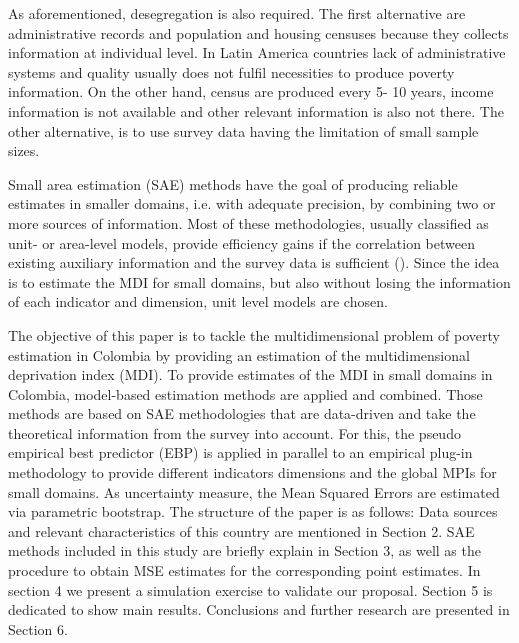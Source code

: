 \documentclass[a4paper, 11pt]{article}
\begin{document}
As aforementioned, desegregation is also required. The first alternative are administrative records and population and housing censuses because they collects information at individual level. In Latin America countries lack of administrative systems and quality usually does not fulfil necessities to produce poverty information. On the other hand, census are produced every 5- 10 years, income information is not available and other relevant information is also not there. The other alternative, is to use survey data having the limitation of small sample sizes. 

Small area estimation (SAE) methods have the goal of producing reliable estimates in smaller domains, i.e. with adequate precision, by combining two or more sources of information. Most of these methodologies, usually classified as unit- or area-level models, provide efficiency gains if the correlation between existing auxiliary information and the survey data is sufficient (\citealt{Pfeffermann2013, Rao2015,  Pratesi2016, tzavidis2018start}).  Since the idea is to estimate the MDI for small domains, but also without losing the information of each indicator and dimension, unit level models are chosen. 


The objective of this paper is to tackle the multidimensional problem of poverty estimation in Colombia by providing an estimation of the multidimensional deprivation index (MDI). To provide estimates of the MDI in small domains in Colombia, model-based estimation methods are applied and combined. Those methods are based on SAE methodologies that are data-driven and take the theoretical information from the survey into account. For this, the pseudo empirical best predictor (EBP) is applied in parallel to an empirical plug-in methodology to provide different indicators dimensions and the global MPIs for small domains. As uncertainty measure, the Mean Squared Errors are estimated via parametric bootstrap.
The structure of the paper is as follows: Data sources and relevant characteristics of this country are mentioned in Section 2. SAE methods included in this study are briefly explain in Section 3, as well as the procedure to obtain MSE estimates for the corresponding point estimates. In section 4 we present a simulation exercise to validate our proposal. Section 5 is dedicated to show main results. Conclusions and further research are presented in Section 6. 


\end{document}
